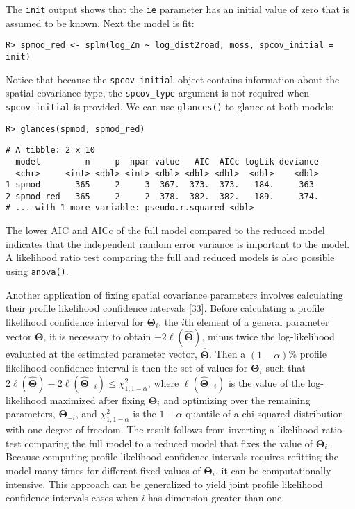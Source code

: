 \documentclass[10pt,letterpaper]{article}
\begin{document}
The \texttt{init} output shows that the \texttt{ie} parameter has an
initial value of zero that is assumed to be known. Next the model is
fit:

\begin{verbatim}
R> spmod_red <- splm(log_Zn ~ log_dist2road, moss, spcov_initial = init)
\end{verbatim}

Notice that because the \texttt{spcov\_initial} object contains
information about the spatial covariance type, the \texttt{spcov\_type}
argument is not required when \texttt{spcov\_initial} is provided. We
can use \texttt{glances()} to glance at both models:

\begin{verbatim}
R> glances(spmod, spmod_red)
\end{verbatim}

\begin{verbatim}
# A tibble: 2 x 10
  model         n     p  npar value   AIC  AICc logLik deviance
  <chr>     <int> <dbl> <int> <dbl> <dbl> <dbl>  <dbl>    <dbl>
1 spmod       365     2     3  367.  373.  373.  -184.     363 
2 spmod_red   365     2     2  378.  382.  382.  -189.     374.
# ... with 1 more variable: pseudo.r.squared <dbl>
\end{verbatim}

The lower AIC and AICc of the full model compared to the reduced model
indicates that the independent random error variance is important to the
model. A likelihood ratio test comparing the full and reduced models is
also possible using \texttt{anova()}.

Another application of fixing spatial covariance parameters involves
calculating their profile likelihood confidence intervals {[}33{]}.
Before calculating a profile likelihood confidence interval for
\(\boldsymbol{\Theta}_i\), the \(i\)th element of a general parameter
vector \(\boldsymbol{\Theta}\), it is necessary to obtain
\(-2\ell(\hat{\boldsymbol{\Theta}})\), minus twice the log-likelihood
evaluated at the estimated parameter vector,
\(\hat{\boldsymbol{\Theta}}\). Then a \((1 - \alpha)\)\% profile
likelihood confidence interval is then the set of values for
\(\boldsymbol{\Theta}_i\) such that
\(2\ell(\hat{\boldsymbol{\Theta}}) - 2\ell(\hat{\boldsymbol{\Theta}}_{-i}) \leq \chi^2_{1, 1 - \alpha}\),
where \(\ell(\hat{\boldsymbol{\Theta}}_{-i})\) is the value of the
log-likelihood maximized after fixing \(\boldsymbol{\Theta}_i\) and
optimizing over the remaining parameters, \(\boldsymbol{\Theta}_{-i}\),
and \(\chi^2_{1, 1 - \alpha}\) is the \(1 - \alpha\) quantile of a
chi-squared distribution with one degree of freedom. The result follows
from inverting a likelihood ratio test comparing the full model to a
reduced model that fixes the value of \(\boldsymbol{\Theta}_i\). Because
computing profile likelihood confidence intervals requires refitting the
model many times for different fixed values of
\(\boldsymbol{\Theta}_i\), it can be computationally intensive. This
approach can be generalized to yield joint profile likelihood confidence
intervals cases when \(i\) has dimension greater than one.
\end{document}
